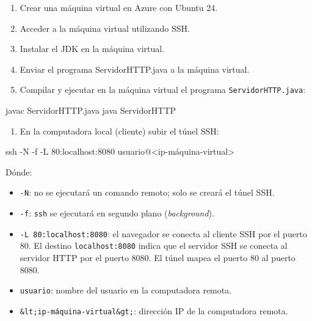 \documentclass[11pt,a4paper,oneside]{book}
\begin{document}
\begin{enumerate}

\item Crear una máquina virtual en Azure con Ubuntu 24.

\item Acceder a la máquina virtual utilizando SSH.

\item Instalar el JDK en la máquina virtual.

\item Enviar el programa ServidorHTTP.java a la máquina virtual.

\item Compilar y ejecutar en la máquina virtual el programa \texttt{ServidorHTTP.java}:

\end{enumerate}

\begin{SourceCode}
javac ServidorHTTP.java
java ServidorHTTP
\end{SourceCode}

\begin{enumerate}

\item En la computadora local (cliente) subir el túnel SSH:

\end{enumerate}

\begin{SourceCode}
ssh -N -f -L 80:localhost:8080 usuario@<ip-máquina-virtual>
\end{SourceCode}

Dónde:

\begin{itemize}

\item \texttt{-N}: no se ejecutará un comando remoto; solo se creará el túnel SSH.

\item \texttt{-f}: \texttt{ssh} se ejecutará en segundo plano (\emph{background}).

\item \texttt{-L 80:localhost:8080}: el navegador se conecta al cliente SSH por el puerto 80. El destino \texttt{localhost:8080} indica que el servidor SSH se conecta al servidor HTTP por el puerto 8080. El túnel mapea el puerto 80 al puerto 8080.

\item \texttt{usuario}: nombre del usuario en la computadora remota.

\item \texttt{\&lt;ip-máquina-virtual\&gt;}: dirección IP de la computadora remota.

\end{itemize}
\end{document}
